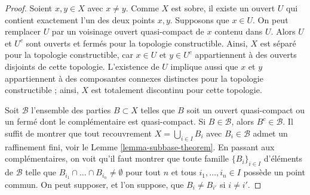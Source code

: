 \begin{proof}
Soient $x, y \in X$ avec $x \not = y$. Comme $X$ est sobre, il existe
un ouvert $U$ qui contient exactement l'un des deux points $x, y$.
Supposons que $x \in U$. On peut remplacer $U$ par un voisinage ouvert
quasi-compact de $x$ contenu dans $U$. Alors $U$ et $U^c$ sont ouverts et
fermés pour la topologie constructible. Ainsi, $X$ est séparé pour la
topologie constructible, car $x \in U$ et $y \in U^c$ appartiennent à des
ouverts disjoints de cette topologie. L'existence de $U$ implique aussi que
$x$ et $y$ appartiennent à des composantes connexes distinctes pour la
topologie constructible ; ainsi, $X$ est totalement discontinu pour cette
topologie.

\medskip\noindent
Soit $\mathcal{B}$ l'ensemble des parties $B \subset X$ telles que $B$ soit
un ouvert quasi-compact ou un fermé dont le complémentaire est
quasi-compact. Si $B \in \mathcal{B}$, alors $B^c \in \mathcal{B}$.
Il suffit de montrer que tout recouvrement $X = \bigcup_{i \in I} B_i$
avec $B_i \in \mathcal{B}$ admet un raffinement fini, voir le
Lemme \ref{lemma-subbase-theorem}.
En passant aux complémentaires, on voit qu'il faut montrer que toute famille
$\{B_i\}_{i \in I}$ d'éléments de $\mathcal{B}$ telle que
$B_{i_1} \cap \ldots \cap B_{i_n} \not = \emptyset$
pour tout $n$ et tous $i_1, \ldots, i_n \in I$
possède un point commun. On peut supposer, et l'on suppose,
que $B_i \not = B_{i'}$ si $i \not = i'$.


\end{proof}
